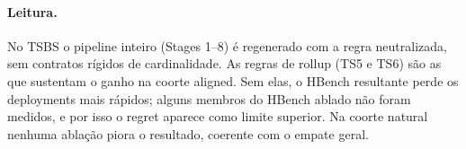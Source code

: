 \paragraph{Leitura.} No TSBS o pipeline inteiro (Stages 1--8) é regenerado com a regra neutralizada, sem contratos rígidos de cardinalidade. As regras de rollup (TS5 e TS6) são as que sustentam o ganho na coorte aligned. Sem elas, o HBench resultante perde os deployments mais rápidos; alguns membros do HBench ablado não foram medidos, e por isso o regret aparece como limite superior. Na coorte natural nenhuma ablação piora o resultado, coerente com o empate geral.
